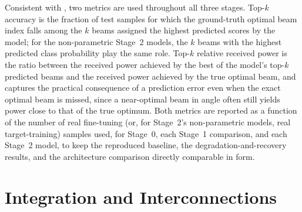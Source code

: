 \documentclass{iutbscthesis}
\begin{document}
Consistent with \textcite{jiang2023digitaltwinbeam}, two metrics are used throughout all three stages. Top-$k$ accuracy is the fraction of test samples for which the ground-truth optimal beam index falls among the $k$ beams assigned the highest predicted scores by the model; for the non-parametric Stage~2 models, the $k$ beams with the highest predicted class probability play the same role. Top-$k$ relative received power is the ratio between the received power achieved by the best of the model's top-$k$ predicted beams and the received power achieved by the true optimal beam, and captures the practical consequence of a prediction error even when the exact optimal beam is missed, since a near-optimal beam in angle often still yields power close to that of the true optimum. Both metrics are reported as a function of the number of real fine-tuning (or, for Stage~2's non-parametric models, real target-training) samples used, for Stage~0, each Stage~1 comparison, and each Stage~2 model, to keep the reproduced baseline, the degradation-and-recovery results, and the architecture comparison directly comparable in form.

\section{Integration and Interconnections}
\label{sec:integration}
\end{document}
